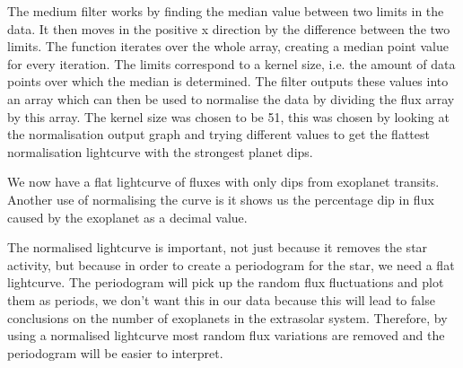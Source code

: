 \documentclass[11pt]{article}
\begin{document}
The medium filter works by finding the median value between two limits
in the data. It then moves in the positive x direction by the difference
between the two limits. The function iterates over the whole array,
creating a median point value for every iteration. The limits correspond
to a kernel size, i.e. the amount of data points over which the median
is determined. The filter outputs these values into an array which can
then be used to normalise the data by dividing the flux array by this
array. The kernel size was chosen to be 51, this was chosen by looking
at the normalisation output graph and trying different values to get the
flattest normalisation lightcurve with the strongest planet dips.

We now have a flat lightcurve of fluxes with only dips from exoplanet
transits. Another use of normalising the curve is it shows us the
percentage dip in flux caused by the exoplanet as a decimal value.

The normalised lightcurve is important, not just because it removes the
star activity, but because in order to create a periodogram for the
star, we need a flat lightcurve. The periodogram will pick up the random
flux fluctuations and plot them as periods, we don't want this in our
data because this will lead to false conclusions on the number of
exoplanets in the extrasolar system. Therefore, by using a normalised
lightcurve most random flux variations are removed and the periodogram
will be easier to interpret.
\end{document}
